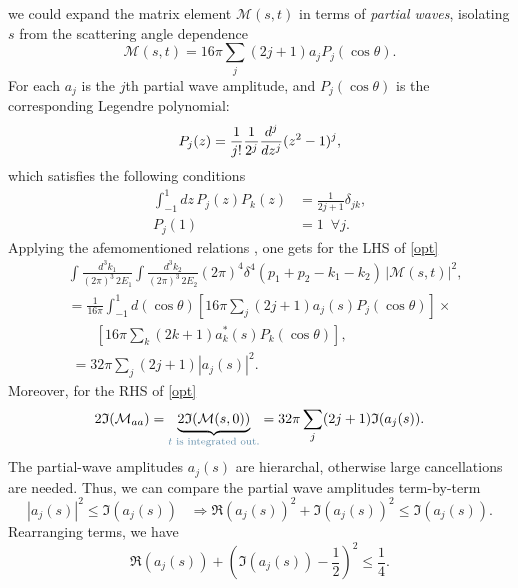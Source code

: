we could expand the matrix element $\mathcal M (s,t)$ in terms of \emph{partial waves}, isolating $s$ from the scattering angle dependence
\begin{equation}
	\mathcal M (s,t) = 16 \pi \sum_j (2j+1)a_j P_j(\cos \theta).
\end{equation}
For each $a_j $ is the $j$th partial wave amplitude, and  $P_j(\cos \theta)$ is the corresponding  Legendre polynomial:
\begin{equation}
	P_j(z) = \frac{1}{j!}\frac{1}{2^j} {d^j\over dz^j} (z^2-1)^j,
\end{equation}
which satisfies the following conditions
\begin{subequations}
	\begin{align}
		\int_{-1}^{1} dz \,P_j(z) P_k(z) &= \frac{1}{2j+1} \delta_{jk}, \\
		P_j(1) &= 1 \,\,\, \forall j.
	\end{align}
\end{subequations}
Applying the afemomentioned relations , one gets for the LHS of \eqref{opt}  
\begin{align}
	&\int  \frac{d^3k_1}{(2 \pi)^3\,2E_1} \int  \frac{d^3k_2}{(2 \pi)^3\,2E_2} (2 \pi)^4 \delta^4(p_1+p_2-k_1-k_2)\,| \mathcal M (s,t)|^2 ,\nonumber \\
	&= \frac{1}{16 \pi} \int_{-1}^{1} d(\cos \theta) \left[ 16 \pi \sum_j (2j+1) a_j(s) P_j(\cos \theta)\right] \times \nonumber\\ & \qquad \left[ 16 \pi \sum_k (2k+1) a_k^*(s) P_k(\cos \theta)\right], \nonumber \\
	& \; = 32 \pi \sum_j (2j+1)| a_j(s)|^2.
\end{align}
Moreover, for the RHS of \eqref{opt}
\begin{equation}
	2 \mathfrak{I}( \mathcal M_{aa}) = \underbrace{2 \mathfrak{I}( \mathcal M(s,0))}_{\color{Mahogany}\text{$t$ is integrated out.}} = 32 \pi  \sum_j (2j+1) \mathfrak{I} (a_j(s)). 
\end{equation}
 The partial-wave amplitudes $a_j(s)$ are  hierarchal, otherwise large cancellations are needed. Thus,  we can compare the partial wave amplitudes term-by-term 
\begin{equation}
	| a_j(s)|^2 \leq \mathfrak{I} (a_j(s)) \;\;\; \Rightarrow \mathfrak{R} (a_j(s))^2+ \mathfrak{I} (a_j(s))^2 \leq \mathfrak{I} (a_j(s)).
\end{equation}
Rearranging terms, we have
\begin{equation}
	\mathfrak{R} (a_j(s)) +\left( \mathfrak{I} (a_j(s))- \frac{1}{2} \right)^2 \leq \frac{1}{4}.
\end{equation}
